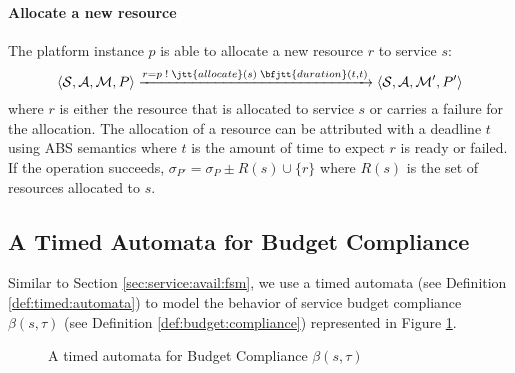 \paragraph{Allocate a new resource}
The platform instance $p$ is able to allocate a new resource $r$ to service $s$:
\[
\langle \mathcal{S}, \mathcal{A}, \mathcal{M}, P \rangle
\xrightarrow[]{r = p \; ! \; \jtt{allocate}(s) \; \bfjtt{duration}(t,t)}
\langle \mathcal{S}, \mathcal{A}, \mathcal{M'}, P' \rangle
\]
where $r$ is either the resource that is allocated to service $s$ or carries a failure for the allocation.
The allocation of a resource can be attributed with a deadline $t$ using ABS semantics where $t$ is the amount of time to expect $r$ is ready or failed.
If the operation succeeds, $\sigma_{P'} = \sigma_{P} \pm R(s) \cup \{r\}$ where $R(s)$ is the set of resources allocated to $s$.


\subsection{A Timed Automata for Budget Compliance}
\label{sec:prop:budget}

Similar to Section \ref{sec:service:avail:fsm}, we use a timed automata (see Definition \ref{def:timed:automata}) to model the behavior of service budget compliance $\beta(s,\tau)$ (see Definition \ref{def:budget:compliance}) represented in Figure \ref{fig:fsm:budgetcomp}.
% 
\begin{figure}[h]
\centering
{}
\caption{A timed automata for Budget Compliance $\beta(s,\tau)$}
\label{fig:fsm:budgetcomp}
\end{figure}
% 

